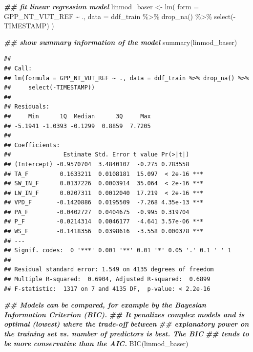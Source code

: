 \documentclass[
]{book}
\newenvironment{Shaded}{\begin{snugshade}}{\end{snugshade}}
\newcommand{\AttributeTok}[1]{\textcolor[rgb]{0.77,0.63,0.00}{#1}}
\newcommand{\DocumentationTok}[1]{\textcolor[rgb]{0.56,0.35,0.01}{\textbf{\textit{#1}}}}
\newcommand{\FunctionTok}[1]{\textcolor[rgb]{0.00,0.00,0.00}{#1}}
\newcommand{\NormalTok}[1]{#1}
\newcommand{\OtherTok}[1]{\textcolor[rgb]{0.56,0.35,0.01}{#1}}
\newcommand{\SpecialCharTok}[1]{\textcolor[rgb]{0.00,0.00,0.00}{#1}}
\begin{document}
\begin{Shaded}
\begin{Highlighting}[]
\DocumentationTok{\#\# fit linear regression model}
\NormalTok{linmod\_baser }\OtherTok{\textless{}{-}} \FunctionTok{lm}\NormalTok{(}
  \AttributeTok{form =}\NormalTok{ GPP\_NT\_VUT\_REF }\SpecialCharTok{\textasciitilde{}}\NormalTok{ ., }
  \AttributeTok{data =}\NormalTok{ ddf\_train }\SpecialCharTok{\%\textgreater{}\%} 
    \FunctionTok{drop\_na}\NormalTok{() }\SpecialCharTok{\%\textgreater{}\%} 
    \FunctionTok{select}\NormalTok{(}\SpecialCharTok{{-}}\NormalTok{TIMESTAMP)}
\NormalTok{)}

\DocumentationTok{\#\# show summary information of the model}
\FunctionTok{summary}\NormalTok{(linmod\_baser)}
\end{Highlighting}
\end{Shaded}

\begin{verbatim}
## 
## Call:
## lm(formula = GPP_NT_VUT_REF ~ ., data = ddf_train %>% drop_na() %>% 
##     select(-TIMESTAMP))
## 
## Residuals:
##     Min      1Q  Median      3Q     Max 
## -5.1941 -1.0393 -0.1299  0.8859  7.7205 
## 
## Coefficients:
##               Estimate Std. Error t value Pr(>|t|)    
## (Intercept) -0.9570704  3.4840107  -0.275 0.783558    
## TA_F         0.1633211  0.0108181  15.097  < 2e-16 ***
## SW_IN_F      0.0137226  0.0003914  35.064  < 2e-16 ***
## LW_IN_F      0.0207311  0.0012040  17.219  < 2e-16 ***
## VPD_F       -0.1420886  0.0195509  -7.268 4.35e-13 ***
## PA_F        -0.0402727  0.0404675  -0.995 0.319704    
## P_F         -0.0214314  0.0046177  -4.641 3.57e-06 ***
## WS_F        -0.1418356  0.0398616  -3.558 0.000378 ***
## ---
## Signif. codes:  0 '***' 0.001 '**' 0.01 '*' 0.05 '.' 0.1 ' ' 1
## 
## Residual standard error: 1.549 on 4135 degrees of freedom
## Multiple R-squared:  0.6904, Adjusted R-squared:  0.6899 
## F-statistic:  1317 on 7 and 4135 DF,  p-value: < 2.2e-16
\end{verbatim}

\begin{Shaded}
\begin{Highlighting}[]
\DocumentationTok{\#\# Models can be compared, for example by the Bayesian Information Criterion (BIC). }
\DocumentationTok{\#\# It penalizes complex models and is optimal (lowest) where the trade{-}off between }
\DocumentationTok{\#\# explanatory power on the training set vs. number of predictors is best. The BIC}
\DocumentationTok{\#\# tends to be more conservative than the AIC.}
\FunctionTok{BIC}\NormalTok{(linmod\_baser)}
\end{Highlighting}
\end{Shaded}
\end{document}
